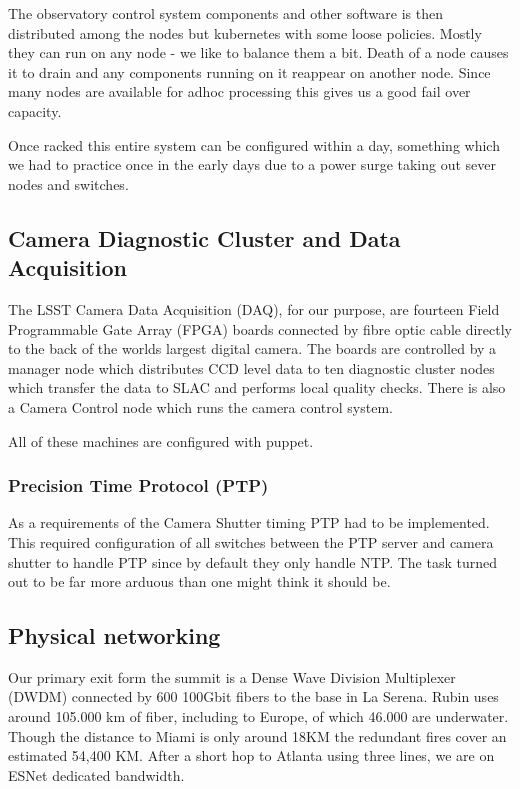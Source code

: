 The observatory control system components and other software is then distributed among the nodes but kubernetes
with some loose policies.
Mostly they can run on any node - we like to balance them a bit.
Death of a node causes it to drain and any components running on it reappear on another node.
Since many nodes are available for adhoc processing this gives us a good fail over capacity.

Once racked this entire system can be configured within a day, something which we had to practice once in the early days due to a power surge taking out sever nodes and switches.






\subsection{Camera Diagnostic Cluster and Data Acquisition \label{sec:cdc}}

The LSST Camera Data Acquisition (DAQ), for our purpose, are fourteen Field Programmable Gate Array (FPGA) boards connected by fibre optic cable directly to the back of the worlds largest digital camera.
The boards are controlled by a manager node which distributes CCD level data to ten diagnostic cluster nodes which transfer the data to SLAC and performs local quality checks.
There is also a Camera Control node which runs the camera control system.

All of these machines are configured with puppet.

\subsubsection{Precision Time Protocol (PTP)}

As a requirements of the Camera Shutter timing PTP had to be implemented.
This required configuration of all switches between the PTP server and camera shutter to handle PTP since by default they only handle NTP.
The task turned out to be far more arduous than one might think it should be.

\subsection{Physical networking}
Our primary exit form the summit is a Dense Wave Division Multiplexer (DWDM) connected by 600 100Gbit fibers to the base in La Serena.
Rubin uses around 105.000 km of fiber, including to Europe, of which  46.000 are underwater. Though the distance to Miami is only around 18KM the redundant fires cover an estimated 54,400 KM. After a short hop to Atlanta using three lines,  we are on ESNet dedicated bandwidth.

